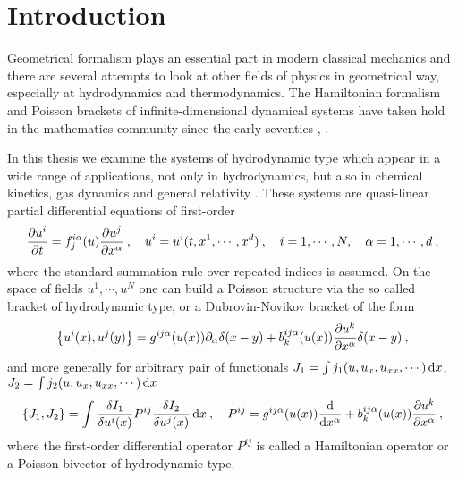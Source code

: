 \chapter*{Introduction}

Geometrical formalism plays an essential part in modern classical mechanics and there are several attempts to look at other fields of physics in geometrical way, especially at hydrodynamics and thermodynamics. The Hamiltonian formalism and Poisson brackets of infinite-dimensional dynamical systems have taken hold in the mathematics community since the early seventies \cite{GMD}, \cite{Generic}.

In this thesis we examine the systems of hydrodynamic type which appear in a wide range of applications, not only in hydrodynamics, but also in chemical kinetics, gas dynamics and general relativity \cite{Savoldi}. These systems are quasi-linear partial differential equations of first-order
\begin{align}
    \frac{\partial u^i}{\partial t} = f^{i \alpha}_j(u) \frac{\partial u^j}{\partial x^\alpha} \:, \quad u^i=u^i(t, x^1, \cdots, x^d) \:, \quad i = 1, \cdots, N, \quad \alpha = 1, \cdots, d \:,
\end{align}
where the standard summation rule over repeated indices is assumed. On the space of fields $u^1, \cdots, u^N$ one can build a Poisson structure via the so called bracket of hydrodynamic type, or a Dubrovin-Novikov bracket of the form
\begin{align}
    \left \lbrace u^i(x),u^j(y) \right \rbrace = g^{ij \alpha}(u(x)) \partial_\alpha \delta(x-y) + b^{ij \alpha}_k (u(x)) \frac{\partial u^k}{\partial x^\alpha} \delta(x-y) \:,
\end{align}
and more generally for arbitrary pair of functionals $J_1 = \int j_1(u,u_x,u_{xx},\cdots) \, \mathrm{d} x$, $J_2 = \int j_2(u,u_x,u_{xx},\cdots) \, \mathrm{d} x$
\begin{align}
    \left \lbrace J_1, J_2 \right \rbrace = \int \frac{\delta I_1}{\delta u^i(x)} P^{ij} \frac{\delta I_2}{\delta u^j(x)} \, \mathrm{d} x \:, \quad P^{ij} = g^{ij \alpha}(u(x)) \frac{\mathrm{d}}{\mathrm{d}x^\alpha} + b^{ij \alpha}_k(u(x)) \frac{\partial u^k}{\partial x^\alpha} \:,
\end{align}
where the first-order differential operator $P^{ij}$ is called a Hamiltonian operator or a Poisson bivector of hydrodynamic type. 


